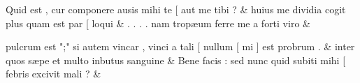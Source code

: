 \documentclass[12pt,onecolumn,twoside,a4paper]{memoir}
\begin{document}
\begin{pairs}
\begin{Leftside}
                              Quid
                              est
                              ,
                              cur
                              componere
                              ausis
                              mihi
                              te
                              [
                              aut
                              me
                              tibi
                              ? \&
                         \stanza {}
                     huius
                              me
                              dividia
                              cogit
                              plus
                              quam
                              est
                              par
                              [
                              loqui \&
                         \stanza {}.
                              .
                              .
                              .
                              nam
                              tropæum
                              ferre
                              me
                              a
                              forti
                              viro & 
                     
                              pulcrum
                              est
                              ";"
                              si
                              autem
                              vincar
                              ,
                              vinci
                              a
                              tali
                              [
                              nullum
                              [
                              mi
                              ]
                              est
                              probrum
                              . \&
                         \stanza {}
                     inter
                              quos
                              sæpe
                              et
                              multo
                              inbutus
                              sanguine \&
                         \stanza {}
                     Bene
                              facis
                              :
                              sed
                              nunc
                              quid
                              subiti
                              mihi
                              [
                              febris
                              excivit
                              mali
                              ? \&
                         \stanza {}
                     

\end{Leftside}
\end{pairs}
\end{document}
